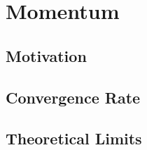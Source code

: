 
\chapter{Momentum}

\section{Motivation}

\section{Convergence Rate}

\section{Theoretical Limits}


\endinput
